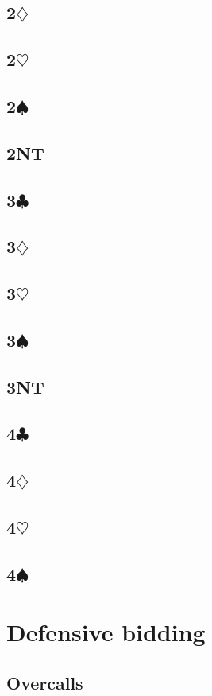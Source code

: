 \documentclass[10pt]{article}
\renewcommand{\c}{$\clubsuit$}
\renewcommand{\d}{$\diamondsuit$}
\newcommand{\h}{$\heartsuit$}
\newcommand{\s}{$\spadesuit$}
\newcommand{\pdfc}{\texorpdfstring{\c{}}{C}}
\newcommand{\pdfd}{\texorpdfstring{\d{}}{D}}
\newcommand{\pdfh}{\texorpdfstring{\h{}}{H}}
\newcommand{\pdfs}{\texorpdfstring{\s{}}{S}}
\begin{document}
\begin{multicols*}{2}
\subsection{2\pdfd}
\subsection{2\pdfh}
\subsection{2\pdfs}
\subsection{2NT}
\subsection{3\pdfc}
\subsection{3\pdfd}
\subsection{3\pdfh}
\subsection{3\pdfs}
\subsection{3NT}
\subsection{4\pdfc}
\subsection{4\pdfd}
\subsection{4\pdfh}
\subsection{4\pdfs}

\newpage
\section{Defensive bidding}
\subsection{Overcalls}


\end{multicols*}
\end{document}
